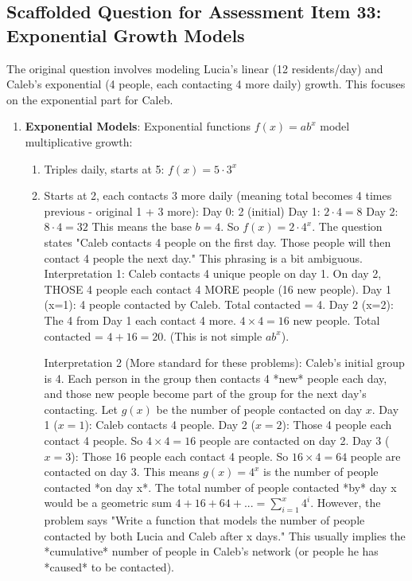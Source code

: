 \documentclass[12pt]{article}
\begin{document}
\subsection*{Scaffolded Question for Assessment Item 33: Exponential Growth Models}
The original question involves modeling Lucia’s linear (12 residents/day) and Caleb’s exponential (4 people, each contacting 4 more daily) growth. This focuses on the exponential part for Caleb.

\begin{enumerate}[label=33-Exp.\arabic*]
    \item \textbf{Exponential Models}: Exponential functions \( f(x) = ab^x \) model multiplicative growth:
    \begin{enumerate}[label=\alph*)]
        \item Triples daily, starts at 5: \( f(x) = 5 \cdot 3^x \)
        \item Starts at 2, each contacts 3 more daily (meaning total becomes 4 times previous - original 1 + 3 more):
        Day 0: 2 (initial)
        Day 1: \(2 \cdot 4 = 8\)
        Day 2: \(8 \cdot 4 = 32\)
        This means the base \(b=4\). So \(f(x) = 2 \cdot 4^x\).
        The question states "Caleb contacts 4 people on the first day. Those people will then contact 4 people the next day."
        This phrasing is a bit ambiguous.
        Interpretation 1: Caleb contacts 4 unique people on day 1. On day 2, THOSE 4 people each contact 4 MORE people (16 new people).
        Day 1 (x=1): 4 people contacted by Caleb. Total contacted = 4.
        Day 2 (x=2): The 4 from Day 1 each contact 4 more. \(4 \times 4 = 16\) new people. Total contacted = \(4+16=20\). (This is not simple \(ab^x\)).

        Interpretation 2 (More standard for these problems): Caleb's initial group is 4. Each person in the group then contacts 4 *new* people each day, and those new people become part of the group for the next day's contacting.
        Let \(g(x)\) be the number of people contacted on day \(x\).
        Day 1 (\(x=1\)): Caleb contacts 4 people.
        Day 2 (\(x=2\)): Those 4 people each contact 4 people. So \(4 \times 4 = 16\) people are contacted on day 2.
        Day 3 (\(x=3\)): Those 16 people each contact 4 people. So \(16 \times 4 = 64\) people are contacted on day 3.
        This means \(g(x) = 4^x\) is the number of people contacted *on day x*.
        The total number of people contacted *by* day x would be a geometric sum \(4+16+64+... = \sum_{i=1}^x 4^i\).
        However, the problem says "Write a function that models the number of people contacted by both Lucia and Caleb after x days." This usually implies the *cumulative* number of people in Caleb's network (or people he has *caused* to be contacted).


\end{enumerate}
\end{enumerate}
\end{document}

